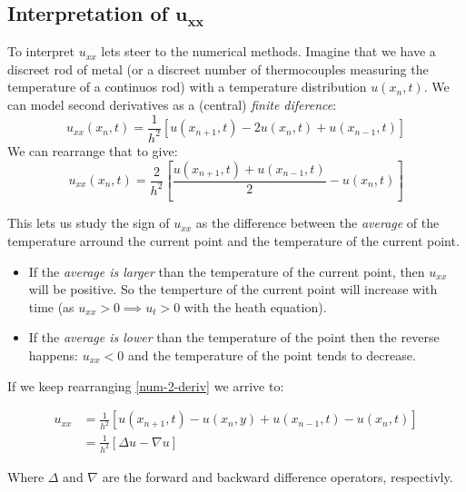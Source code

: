 \documentclass[../pde.tex]{subfiles}
\begin{document}
    \subsection{\sffamily Interpretation of $\mathbf{u_{xx}}$}
    To interpret $u_{xx}$ lets steer to the numerical methods. Imagine that we have a discreet rod of metal (or a discreet number
    of thermocouples measuring the temperature of a continuos rod) with a temperature distribution $u(x_n,t)$. We can model second
    derivatives as a  (central) \emph{finite diference}:
    \begin{equation*}
        u_{xx}(x_n,t) = \frac{1}{h^2}[u(x_{n+1},t) - 2u(x_n,t) + u(x_{n-1},t)]
    \end{equation*}
    We can rearrange that to give:
    \begin{equation}\label{num-2-deriv}
        u_{xx}(x_n,t) = \frac{2}{h^2}\left[\frac{u(x_{n+1},t)+u(x_{n-1},t)}{2}-u(x_n,t)\right]
    \end{equation}
    
    This lets us study the sign of $u_{xx}$ as the difference between the \emph{average} of the temperature arround the current point
    and the temperature of the current point.
    \begin{itemize}
        \item If the \emph{average is larger} than the temperature of the current point, then $u_{xx}$ will be positive. 
            So the temperture of the current point will increase with
            time (as $u_{xx} > 0 \implies u _{t}>0$ with the heath equation).
        \item If the \emph{average is lower} than the temperature of the point then the reverse happens: $u_{xx} < 0 $ and the 
            temperature of the point tends to decrease.
    \end{itemize}

    If we keep rearranging \eqref{num-2-deriv} we arrive to:

    \begin{align*}
        u_{xx} &= \frac{1}{h^2} \left[ u(x_{n+1},t) - u(x_{n},y) + u(x_{n-1},t) - u(x_{n},t)  \right] \\
               &= \frac{1}{h^2} \left[ \Delta u - \nabla u \right] 
    \end{align*}
        
    Where $\Delta$ and $\nabla$ are the forward and backward difference operators, respectivly.
\end{document}
